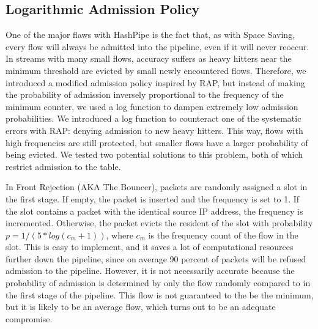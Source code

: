 \subsection{Logarithmic Admission Policy}
One of the major flaws with HashPipe is the fact that, as with Space Saving, every flow will always be admitted into the pipeline, even if it will never reoccur. In streams with many small flows, accuracy suffers as heavy hitters near the minimum threshold are evicted by small newly encountered flows. Therefore, we introduced a modified admission policy inspired by RAP, but instead of making the probability of admission inversely proportional to the frequency of the minimum counter, we used a log function to dampen extremely low admission probabilities. We introduced a log function to counteract one of the systematic errors with RAP: denying admission to new heavy hitters. This way, flows with high frequencies are still protected, but smaller flows have a larger probability of being evicted. We tested two potential solutions to this problem, both of which restrict admission to the table.

In Front Rejection (AKA The Bouncer), packets are randomly assigned a slot in the first stage. If empty, the packet is inserted and the frequency is set to 1. If the slot contains a packet with the identical source IP address, the frequency is incremented. Otherwise, the packet evicts the resident of the slot with probability $p = 1 / (5*log(c_m + 1))$, where $c_m$ is the frequency count of the flow in the slot. This is easy to implement, and it saves a lot of computational resources further down the pipeline, since on average 90 percent of packets will be refused admission to the pipeline. However, it is not necessarily accurate because the probability of admission is determined by only the flow randomly compared to in the first stage of the pipeline. This flow is not guaranteed to the be the minimum, but it is likely to be an average flow, which turns out to be an adequate compromise.

